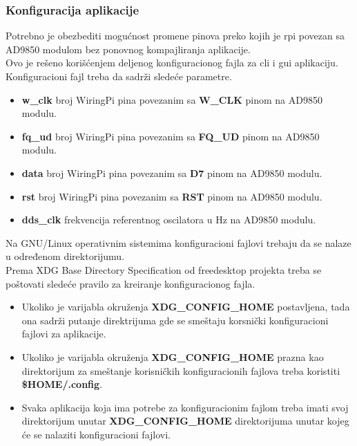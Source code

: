 \subsubsection{Konfiguracija aplikacije} \label{config_file}
Potrebno je obezbediti mogućnost promene pinova preko kojih je \gls{rpi} povezan
sa AD9850 modulom bez ponovnog kompajliranja aplikacije. \\
Ovo je rešeno korišćenjem deljenog konfiguracionog fajla za \gls{cli} i
\gls{gui} aplikaciju. \\

Konfiguracioni fajl treba da sadrži sledeće parametre.
\begin{itemize}
\item \textbf{w\_clk} broj WiringPi pina povezanim sa \textbf{W\_CLK} pinom na AD9850 modulu.
\item \textbf{fq\_ud} broj WiringPi pina povezanim sa \textbf{FQ\_UD} pinom na AD9850 modulu.
\item \textbf{data} broj WiringPi pina povezanim sa \textbf{D7} pinom na AD9850 modulu.
\item \textbf{rst} broj WiringPi pina povezanim sa \textbf{RST} pinom na AD9850 modulu.
\item \textbf{dds\_clk} frekvencija referentnog oscilatora u Hz na AD9850 modulu.
\end{itemize}

Na GNU/Linux operativnim sistemima konfiguracioni fajlovi trebaju da se nalaze
u određenom direktorijumu. \\
Prema XDG Base Directory Specification\cite{xdg_spec} od freedesktop projekta
treba se poštovati sledeće pravilo za kreiranje konfiguracionog fajla.

\begin{itemize}
  \item Ukoliko je varijabla okruženja \textbf{XDG\_CONFIG\_HOME} postavljena,
    tada ona sadrži putanje direktrijuma gde se smeštaju korsnički
    konfiguracioni fajlovi za aplikacije.
  \item Ukoliko je varijabla okruženja \textbf{XDG\_CONFIG\_HOME} prazna kao
    direktorijum za smeštanje korisničkih konfiguracionih fajlova treba
    koristiti \textbf{\$HOME/.config}.
  \item Svaka aplikacija koja ima potrebe za konfiguracionim fajlom treba imati
    svoj direktorijum unutar \textbf{XDG\_CONFIG\_HOME} direktorijuma unutar kojeg će se
    nalaziti konfiguracioni fajlovi.
\end{itemize}

